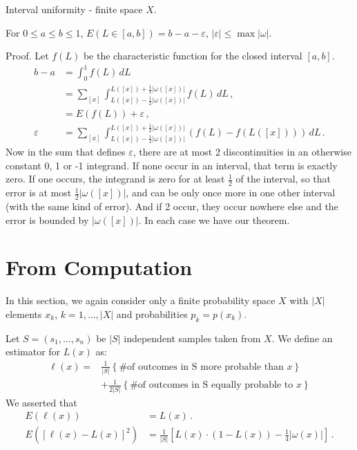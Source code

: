 \begin{theorem}{Interval uniformity - finite space $X$.}

For $0 \leq a \leq b \leq 1$, $E(L \in [a,b])=b-a - \varepsilon$, $|\varepsilon| \leq \max |\omega|$.

Proof.  Let $f(L)$ be the characteristic function for the closed interval $[a,b]$.
\begin{align}
b-a &=\int_0^1 f(L) \, dL  \\
  &= \sum_{[x]} \int_{L([x])-\frac{1}{2}|\omega([x])|}^{L([x])+\frac{1}{2}|\omega([x])|} f(L) \, dL \,, \\
  &= E(f(L)) + \varepsilon \,, \\
\varepsilon &= \sum_{[x]} \int_{L([x])-\frac{1}{2}|\omega([x])|}^{L([x])+\frac{1}{2}|\omega([x])|} (f(L)-f(L([x]))) \, dL \,.
\end{align}
Now in the sum that defines $\varepsilon$, there are at most 2 discontinuities in an otherwise constant 0, 1 or -1 integrand.  If none occur in an interval, that term is exactly zero.  If one occurs, the integrand is zero for at least $\frac{1}{2}$ of the interval, so that error is at most $\frac{1}{2}|\omega([x])|$, and can be only once more in one other interval (with the same kind of error).  And if 2 occur, they occur nowhere else and the error is bounded by $|\omega([x])|$.  In each case we have our theorem.
\end{theorem}

\section{From Computation}

In this section, we again consider only a finite probability space $X$ with $|X|$ elements $x_k$, $k=1,\ldots,|X|$ and probabilities $p_k=p(x_k)$.

Let $S=(s_1, \ldots, s_n)$ be $|S|$ independent samples taken from $X$.  We define an estimator for $L(x)$ as:
\begin{align*}
 \ell(x) = & \frac{1}{|S|} \left\{\text{\# of outcomes in S more probable than $x$}\right\}  \\
 & + \frac{1}{2|S|} \left\{\text{\# of outcomes in S equally probable to $x$}\right\} 
\end{align*}
We asserted that
\begin{align}
\label{eq:elmeanx}
E(\ell(x))&=L(x) \,. \\
\label{eq:elvariancex}
E([\ell(x)-L(x)]^2) &= \frac{1}{|S|} \left[L(x) \cdot (1-L(x)) -\frac{1}{4}|\omega(x)|\right] \,.
\end{align}

